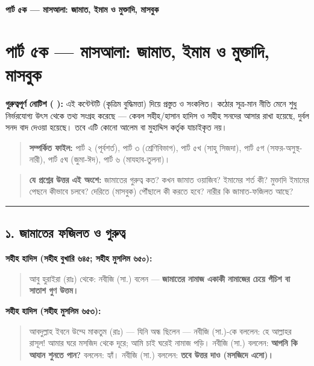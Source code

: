 

\begin{center}{\Large\bfseries\color{emerald} পার্ট ৫ক — মাসআলা: জামাত, ইমাম ও মুক্তাদি, মাসবুক}\end{center}
\vspace{1em}
\section*{পার্ট ৫ক — মাসআলা: জামাত, ইমাম ও মুক্তাদি, মাসবুক}

\begin{warnbox}
 \textbf{গুরুত্বপূর্ণ নোটিশ ( ):} এই কন্টেন্টটি  (কৃত্রিম বুদ্ধিমত্তা) দিয়ে প্রস্তুত ও সংকলিত।  কঠোর সূত্র-মান নীতি মেনে শুধু নির্ভরযোগ্য উৎস থেকে তথ্য সংগ্রহ করেছে — কেবল সহীহ/হাসান হাদিস ও সহীহ সনদের আসার রাখা হয়েছে, দুর্বল সনদ বাদ দেওয়া হয়েছে। তবে এটি কোনো আলেম বা মুহাদ্দিস কর্তৃক যাচাইকৃত নয়।
\end{warnbox}

\begin{quote}
\textbf{সম্পর্কিত ফাইল:} পার্ট ২ (পূর্বশর্ত), পার্ট ৩ (শ্রেণিবিভাগ), পার্ট ৫খ (সাহু সিজদা), পার্ট ৫গ (সফর-অসুস্থ-নারী), পার্ট ৫ঘ (জুমা-ঈদ), পার্ট ৬ (মাযহাব-তুলনা)।
\end{quote}

\begin{quote}
\textbf{যে প্রশ্নের উত্তর এই অংশে:} জামাতের গুরুত্ব কত? কখন জামাত ওয়াজিব? ইমামের শর্ত কী? মুক্তাদি ইমামের পেছনে কীভাবে চলবে? দেরিতে (মাসবুক) পৌঁছালে কী করতে হবে? নারীর কি জামাত-ফজিলত আছে?
\end{quote}

\medskip\hrule\medskip

\subsection*{১. জামাতের ফজিলত ও গুরুত্ব}

\textbf{সহীহ হাদিস (সহীহ বুখারি ৬৪৫; সহীহ মুসলিম ৬৫০):}

\begin{quote}
আবু হুরাইরা (রাঃ) থেকে: নবীজি (সা.) বলেন — \textbf{জামাতের নামাজ একাকী নামাজের চেয়ে পঁচিশ বা সাতাশ গুণ উত্তম।}
\end{quote}

\textbf{সহীহ হাদিস (সহীহ মুসলিম ৬৫৩):}

\begin{quote}
আবদুল্লাহ ইবনে উম্মে মাকতুম (রাঃ) — যিনি অন্ধ ছিলেন — নবীজি (সা.)-কে বললেন: হে আল্লাহর রাসূল! আমার ঘরে মসজিদ থেকে দূরে; আমি চাই ঘরেই নামাজ পড়ি। নবীজি (সা.) বললেন: \textbf{আপনি কি আযান শুনতে পান?} বললেন: হ্যাঁ। নবীজি (সা.) বললেন: \textbf{তবে উত্তর দাও (মসজিদে এসো)।}
\end{quote}

